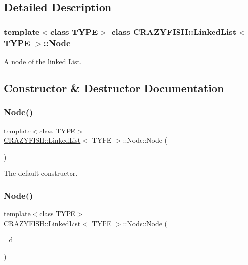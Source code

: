 \subsection{Detailed Description}
\subsubsection*{template$<$class T\+Y\+PE$>$\newline
class C\+R\+A\+Z\+Y\+F\+I\+S\+H\+::\+Linked\+List$<$ T\+Y\+P\+E $>$\+::\+Node}

A node of the linked List. 

\subsection{Constructor \& Destructor Documentation}
\mbox{\label{classCRAZYFISH_1_1LinkedList_1_1Node_a05c9b60566f2abcb8449353d1efef015}} 
\subsubsection{\texorpdfstring{Node()}{Node()}\hspace{0.1cm}{\footnotesize\ttfamily [1/2]}}
{\footnotesize\ttfamily template$<$class T\+Y\+PE$>$ \\
\hyperlink{classCRAZYFISH_1_1LinkedList}{C\+R\+A\+Z\+Y\+F\+I\+S\+H\+::\+Linked\+List}$<$ T\+Y\+PE $>$\+::Node\+::\+Node (\begin{DoxyParamCaption}{ }\end{DoxyParamCaption})\hspace{0.3cm}{\ttfamily [inline]}}

The default constructor. \mbox{\label{classCRAZYFISH_1_1LinkedList_1_1Node_a8b39a874acc9d934134459cee3a1862b}} 
\subsubsection{\texorpdfstring{Node()}{Node()}\hspace{0.1cm}{\footnotesize\ttfamily [2/2]}}
{\footnotesize\ttfamily template$<$class T\+Y\+PE$>$ \\
\hyperlink{classCRAZYFISH_1_1LinkedList}{C\+R\+A\+Z\+Y\+F\+I\+S\+H\+::\+Linked\+List}$<$ T\+Y\+PE $>$\+::Node\+::\+Node (\begin{DoxyParamCaption}\item[{T\+Y\+PE}]{\+\_\+d }\end{DoxyParamCaption})\hspace{0.3cm}{\ttfamily [inline]}}

